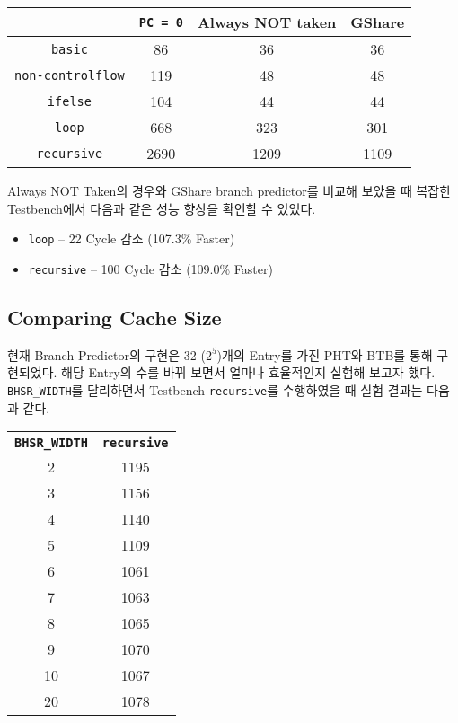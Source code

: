 \documentclass{scrartcl}
\begin{document}
\begin{center}
  \begin{tabular}{| c | c | c | c |}
    \hline
    & \texttt{PC = 0} & Always NOT taken & GShare \\ \hline
    \hline
    \texttt{basic} & 86 & 36 & 36 \\ \hline
    \texttt{non-controlflow} & 119 & 48 & 48 \\ \hline
    \texttt{ifelse} & 104 & 44 & 44 \\ \hline
    \texttt{loop} & 668 & 323 & 301 \\ \hline
    \texttt{recursive} & 2690 & 1209 & 1109 \\ \hline
  \end{tabular}
\end{center}


Always NOT Taken의 경우와 GShare branch predictor를 비교해 보았을 때 복잡한 Testbench에서 다음과 같은 성능 향상을 확인할 수 있었다.
\begin{itemize}
  \item \texttt{loop} -- 22 Cycle 감소 (107.3\% Faster)
  \item \texttt{recursive} -- 100 Cycle 감소 (109.0\% Faster)
\end{itemize}

\subsection{Comparing Cache Size}
현재 Branch Predictor의 구현은 32 ($2^5$)개의 Entry를 가진 PHT와 BTB를 통해 구현되었다. 해당 Entry의 수를 바꿔 보면서 얼마나 효율적인지 실험해 보고자 했다.
\texttt{BHSR\_WIDTH}를 달리하면서 Testbench \texttt{recursive}를 수행하였을 때 실험 결과는 다음과 같다.

\begin{center}
  \begin{tabular}{| c | c |}
    \hline
    \texttt{BHSR\_WIDTH} & \texttt{recursive} \\ \hline
    \hline
    2 & 1195 \\ \hline
    3 & 1156 \\ \hline
    4 & 1140 \\ \hline
    5 & 1109 \\ \hline
    6 & 1061 \\ \hline
    7 & 1063 \\ \hline
    8 & 1065 \\ \hline
    9 & 1070 \\ \hline
    10 & 1067 \\ \hline
    20 & 1078 \\ \hline
  \end{tabular}
\end{center}
\end{document}
